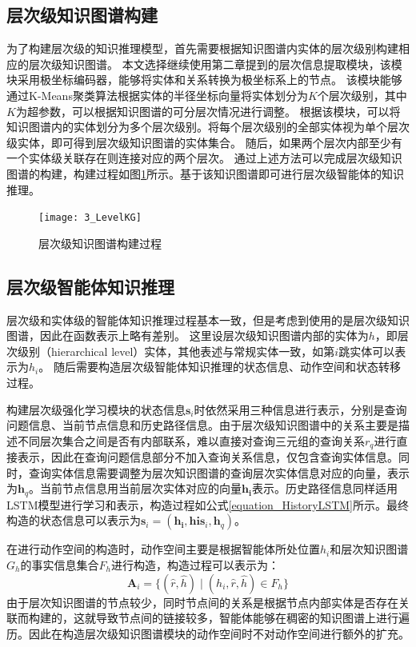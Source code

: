 \documentclass[algorithmlist, AutoFakeBold, AutoFakeSlant, figurelist, tablelist, nomlist, engineering]{seuthesix}
\begin{document}
\subsection{层次级知识图谱构建}
为了构建层次级的知识推理模型，首先需要根据知识图谱内实体的层次级别构建相应的层次级知识图谱。
本文选择继续使用第二章提到的层次信息提取模块，该模块采用极坐标编码器，能够将实体和关系转换为极坐标系上的节点。
该模块能够通过K-Means聚类算法根据实体的半径坐标向量将实体划分为$K$个层次级别，其中$K$为超参数，可以根据知识图谱的可分层次情况进行调整。
根据该模块，可以将知识图谱内的实体划分为多个层次级别。将每个层次级别的全部实体视为单个层次级实体，即可得到层次级知识图谱的实体集合。
随后，如果两个层次内部至少有一个实体级关联存在则连接对应的两个层次。
通过上述方法可以完成层次级知识图谱的构建，构建过程如图\ref{3_LevelKG}所示。基于该知识图谱即可进行层次级智能体的知识推理。
\begin{figure}
  \centering
  \texttt{[image: 3\_LevelKG]}
  \caption{层次级知识图谱构建过程}
  \label{3_LevelKG}
\end{figure}

\subsection{层次级智能体知识推理}
层次级和实体级的智能体知识推理过程基本一致，但是考虑到使用的是层次级知识图谱，因此在函数表示上略有差别。
这里设层次级知识图谱内部的实体为$h$，即层次级别（hierarchical level）实体，其他表述与常规实体一致，如第$i$跳实体可以表示为$h_i$。
随后需要构造层次级智能体知识推理的状态信息、动作空间和状态转移过程。

构建层次级强化学习模块的状态信息$\bm{s}_i$时依然采用三种信息进行表示，分别是查询问题信息、当前节点信息和历史路径信息。由于层次级知识图谱中的关系主要是描述不同层次集合之间是否有内部联系，难以直接对查询三元组的查询关系$r_q$进行直接表示，因此在查询问题信息部分不加入查询关系信息，仅包含查询实体信息。同时，查询实体信息需要调整为层次知识图谱的查询层次实体信息对应的向量，表示为$\bm{h}_q$。当前节点信息用当前层次实体对应的向量$\bm{h_i}$表示。历史路径信息同样适用LSTM模型进行学习和表示，构造过程如公式\ref{equation_HistoryLSTM}所示。最终构造的状态信息可以表示为$\bm{s}_i = (\bm{h_i}, \bm{his}_i, \bm{h}_q)$。

在进行动作空间的构造时，动作空间主要是根据智能体所处位置$h_i$和层次知识图谱$G_h$的事实信息集合$F_h$进行构造，构造过程可以表示为：
\begin{equation}
  \bm{A}_i = \{(\hat{r}, \hat{h}) \mid (h_i, \hat{r}, \hat{h}) \in F_h\}
  \label{base_2}
\end{equation}
由于层次知识图谱的节点较少，同时节点间的关系是根据节点内部实体是否存在关联而构建的，这就导致节点间的链接较多，智能体能够在稠密的知识图谱上进行遍历。因此在构造层次级知识图谱模块的动作空间时不对动作空间进行额外的扩充。
\end{document}
